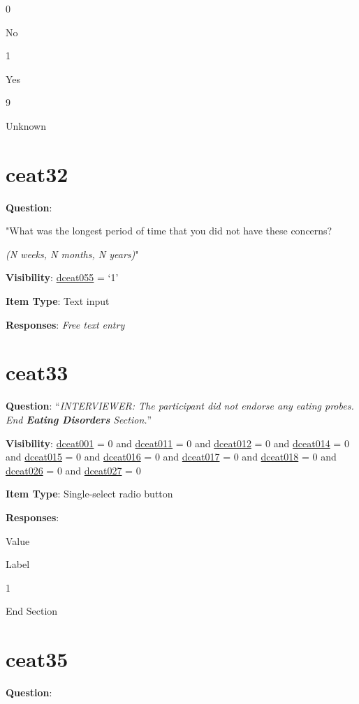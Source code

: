 \documentclass[]{book}
\begin{document}
0

No

1

Yes

9

Unknown

\hypertarget{ceat32}{%
\section{ceat32}\label{ceat32}}

\textbf{Question}:

"What was the longest period of time that you did not have these concerns?

\emph{(N weeks, N months, N years)}"

\textbf{Visibility}: \protect\hyperlink{dceat055}{dceat055} = `1'

\textbf{Item Type}: Text input

\textbf{Responses}: \emph{Free text entry}

\hypertarget{ceat33}{%
\section{ceat33}\label{ceat33}}

\textbf{Question}: ``\emph{INTERVIEWER: The participant did not endorse any eating probes. End \textbf{Eating Disorders} Section.}''

\textbf{Visibility}: \protect\hyperlink{dceat001}{dceat001} = 0 and \protect\hyperlink{dceat011}{dceat011} = 0 and \protect\hyperlink{dceat012}{dceat012} = 0 and \protect\hyperlink{dceat014}{dceat014} = 0 and \protect\hyperlink{dceat015}{dceat015} = 0 and \protect\hyperlink{dceat016}{dceat016} = 0 and \protect\hyperlink{dceat017}{dceat017} = 0 and \protect\hyperlink{dceat018}{dceat018} = 0 and \protect\hyperlink{dceat026}{dceat026} = 0 and \protect\hyperlink{dceat027}{dceat027} = 0

\textbf{Item Type}: Single-select radio button

\textbf{Responses}:

Value

Label

1

End Section

\hypertarget{ceat35}{%
\section{ceat35}\label{ceat35}}

\textbf{Question}:
\end{document}

